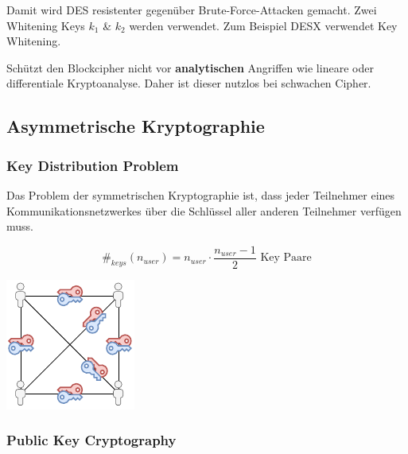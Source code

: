 \documentclass[
  10pt,
  a4paper,
]{article}
\begin{document}
\begin{multicols*}{2}
Damit wird DES resistenter gegenüber Brute-Force-Attacken gemacht. Zwei
Whitening Keys \(k_1\) \& \(k_2\) werden verwendet. Zum Beispiel DESX
verwendet Key Whitening.

\begin{tcolorbox}[enhanced jigsaw, coltitle=black, toprule=.15mm, colframe=quarto-callout-warning-color-frame, breakable, titlerule=0mm, title=\textcolor{quarto-callout-warning-color}{\faExclamationTriangle}\hspace{0.5em}{Warnung}, toptitle=1mm, colback=white, leftrule=.75mm, bottomtitle=1mm, colbacktitle=quarto-callout-warning-color!10!white, left=2mm, bottomrule=.15mm, rightrule=.15mm, arc=.35mm, opacityback=0, opacitybacktitle=0.6]

Schützt den Blockcipher nicht vor \textbf{analytischen} Angriffen wie
lineare oder differentiale Kryptoanalyse. Daher ist dieser nutzlos bei
schwachen Cipher.

\end{tcolorbox}

\subsection{Asymmetrische
Kryptographie}\label{asymmetrische-kryptographie}

\subsubsection{Key Distribution Problem}\label{key-distribution-problem}

Das Problem der symmetrischen Kryptographie ist, dass jeder Teilnehmer
eines Kommunikationsnetzwerkes über die Schlüssel aller anderen
Teilnehmer verfügen muss.

\[
\#_{keys}(n_{user})=n_{user}\cdot\frac{n_{user}-1}{2}\text{ Key Paare}
\]

\begin{center}
\includegraphics{images/crypto/keyprob.pdf}
\end{center}

\subsubsection{\texorpdfstring{Public Key Cryptography
\href{https://www.youtube.com/watch?v=GSIDS_lvRv4}{\color{BrickRed}\faYoutube}}{Public Key Cryptography }}\label{public-key-cryptography}


\end{multicols*}
\end{document}
